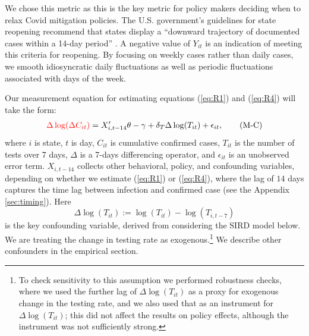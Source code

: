 \documentclass[3p, longtitle]{elsarticle}
\theoremstyle{definition}
\def\ycolor{\color{red}}
\begin{document}
We chose this metric as this is the key metric for policy makers deciding when to relax Covid mitigation policies.  The U.S. government's guidelines for state reopening
recommend that states display a
``downward trajectory of documented cases within a 14-day period''
\citep{whitehouse2020}. A negative value of
$Y_{it}$ is an indication of meeting this
criteria for reopening. By focusing on weekly cases  rather than daily cases, we smooth idiosyncratic daily fluctuations as well as periodic fluctuations associated with days of the week.

Our measurement equation for estimating equations (\ref{eq:R1}) and (\ref{eq:R4}) will take the form:
\begin{align}
{\ycolor \Delta \log(\Delta C_{it})}  =    X_{i,t-14} '   \theta  -\gamma +  \delta_T \Delta   \log(T_{it})  + \epsilon_{it},
 \label{eq:M} \tag{M-C}
\end{align}
where $i$ is state, $t$ is day, $C_{it}$ is cumulative confirmed
cases, $T_{it}$ is the number of tests over 7 days, $\Delta$ is
a 7-days differencing operator, and $\epsilon_{it}$ is an unobserved error term.
 $X_{i,t-14}$  collects other behavioral, policy, and confounding variables, depending
on whether we estimate (\ref{eq:R1}) or (\ref{eq:R4}), where the lag of $14$ days captures the time lag between infection and confirmed case (see the Appendix \ref{sec:timing}). %
   Here
$$\Delta   \log(T_{it} ):=  \log(T_{it}) - \log(T_{i,t-7})  $$ %
is the key confounding variable,
derived from considering the SIRD model below. We are treating the change in testing
rate as exogenous.\footnote{To check sensitivity to this assumption
we performed robustness checks, where we used
the further lag of $\Delta   \log(T_{it} )$ as a proxy for exogenous change in the testing rate, and we also
used that as an instrument for $\Delta   \log(T_{it} )$; this did not affect the results on policy effects, although the instrument
was not sufficiently strong.} We describe other confounders in the empirical section.

\end{document}
